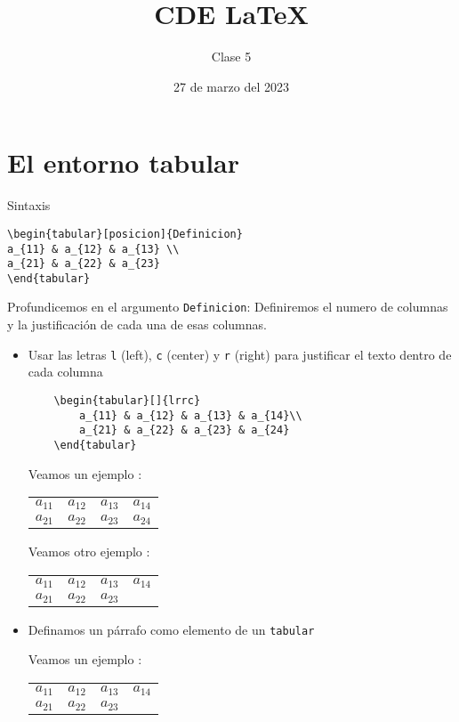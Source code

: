 \documentclass{article}
\title{CDE \LaTeX}
\author{Clase 5}
\date{27 de marzo del 2023}
\begin{document}
\maketitle

\begin{abstract}
	\lipsum[2]
\end{abstract}

\section{El entorno tabular}
\noindent Sintaxis

\begin{verbatim}
\begin{tabular}[posicion]{Definicion}
a_{11} & a_{12} & a_{13} \\
a_{21} & a_{22} & a_{23}
\end{tabular}
\end{verbatim}

Profundicemos en el argumento \verb*|Definicion|:
Definiremos el numero de columnas y la justificación de cada una de esas columnas.
\begin{itemize}
\item Usar las letras \verb*|l| (left), \verb*|c| (center) y \verb*|r| (right) para justificar el texto dentro de cada columna
\begin{verbatim}
	\begin{tabular}[]{lrrc}
		a_{11} & a_{12} & a_{13} & a_{14}\\
		a_{21} & a_{22} & a_{23} & a_{24}
	\end{tabular}
\end{verbatim}

Veamos un ejemplo :

\begin{tabular}[]{lrrc}
	$a_{11}$ & $a_{12}$ & $a_{13}$ & $a_{14}$\\
	$a_{21}$ & $a_{22}$ & $a_{23}$ & $a_{24}$
\end{tabular}

Veamos otro ejemplo :

\begin{tabular}[]{lrrc}
	$a_{11}$ & $a_{12}$ & $a_{13}$ & $a_{14}$\\
	$a_{21}$ & $a_{22}$ & $a_{23}$ & \lipsum[2]
\end{tabular}


\item Definamos un párrafo como elemento de un \verb*|tabular|

Veamos un ejemplo : 

\begin{tabular}[]{lrrp{9cm}}
	$a_{11}$ & $a_{12}$ & $a_{13}$ & $a_{14}$\\
	$a_{21}$ & $a_{22}$ & $a_{23}$ & \lipsum[2]
\end{tabular}
\end{itemize}
\end{document}
